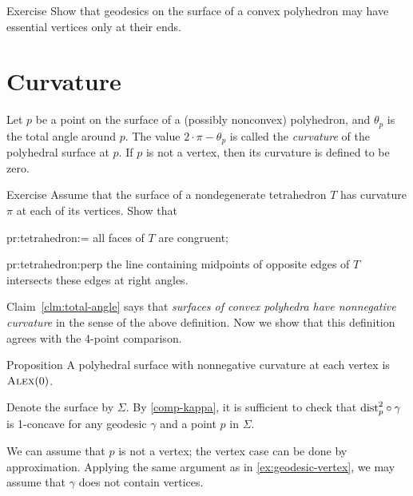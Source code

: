 \begin{thm}{Exercise}\label{ex:geodesic-vertex}
Show that geodesics on the surface of a convex polyhedron may have essential vertices only at their ends.
\end{thm}

\section{Curvature}

Let $p$ be a point on the surface of a (possibly nonconvex) polyhedron, and $\theta_p$ is the total angle around $p$.
The value $2\cdot \pi -\theta_p$ is called the \emph{curvature} of the polyhedral surface at $p$.
If $p$ is not a vertex, then its curvature is defined to be zero.

\begin{thm}{Exercise}\label{pr:tetrahedron}
Assume that the surface of a nondegenerate tetrahedron $T$ has curvature $\pi$ at each of its vertices.
Show that

\begin{subthm}{pr:tetrahedron:=}
all faces of $T$ are congruent;
\end{subthm}

\begin{subthm}{pr:tetrahedron:perp} the line containing midpoints of opposite edges of $T$ intersects these edges at right angles.
\end{subthm}

\end{thm}

Claim~\ref{clm:total-angle} says that \textit{surfaces of convex polyhedra have nonnegative curvature} in the sense of the above definition.
Now we show that this definition agrees with the 4-point comparison.

\begin{thm}{Proposition}\label{prop:poly-CBB}
A polyhedral surface with nonnegative curvature at each vertex is $\textsc{Alex}(0)$.
\end{thm}

Denote the surface by $\Sigma$.
By \ref{comp-kappa}, it is sufficient to check that
$\mathrm{dist}_p^2\circ\gamma$ is 1-concave for any geodesic $\gamma$ and a point $p$ in $\Sigma$.

We can assume that $p$ is not a vertex;
the vertex case can be done by approximation.
Applying the same argument as in \ref{ex:geodesic-vertex}, we may assume that $\gamma$ does not contain vertices.

